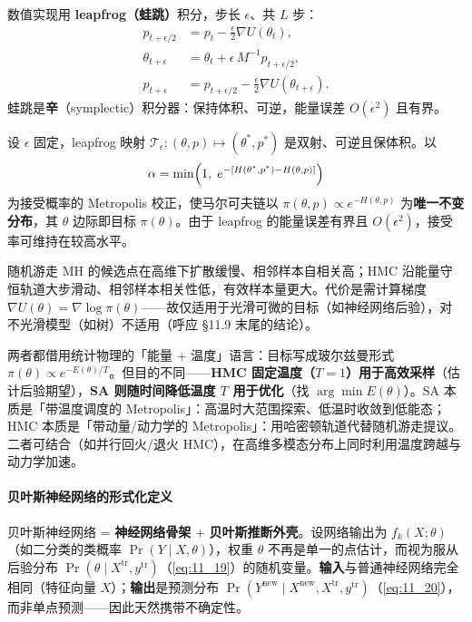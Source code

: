 数值实现用 \textbf{leapfrog（蛙跳）}积分，步长 $\epsilon$、共 $L$ 步：
\begin{align}
p_{t+\epsilon/2} &= p_t - \tfrac{\epsilon}{2}\nabla U(\theta_t), \nonumber \\
\theta_{t+\epsilon} &= \theta_t + \epsilon\, M^{-1} p_{t+\epsilon/2}, \nonumber \\
p_{t+\epsilon} &= p_{t+\epsilon/2} - \tfrac{\epsilon}{2}\nabla U(\theta_{t+\epsilon}). \label{eq:11_20a}
\end{align}
蛙跳是\textbf{辛}（symplectic）积分器：保持体积、可逆，能量误差 $O(\epsilon^2)$ 且有界。

\begin{theorem}
设 $\epsilon$ 固定，leapfrog 映射 $\mathcal{T}_\epsilon:(\theta,p)\mapsto(\theta^*,p^*)$ 是双射、可逆且保体积。以
\[
\alpha = \min\Bigl(1,\; e^{-[H(\theta^*,p^*)-H(\theta,p)]}\Bigr)
\]
为接受概率的 Metropolis 校正，使马尔可夫链以 $\pi(\theta,p)\propto e^{-H(\theta,p)}$ 为\textbf{唯一不变分布}，其 $\theta$ 边际即目标 $\pi(\theta)$。由于 leapfrog 的能量误差有界且 $O(\epsilon^2)$，接受率可维持在较高水平。
\end{theorem}

\begin{remark}
随机游走 MH 的候选点在高维下扩散缓慢、相邻样本自相关高；HMC 沿能量守恒轨道大步滑动、相邻样本相关性低，有效样本量更大。代价是需计算梯度 $\nabla U(\theta)=\nabla\log\pi(\theta)$——故仅适用于光滑可微的目标（如神经网络后验），对不光滑模型（如树）不适用（呼应 §11.9 末尾的结论）。
\end{remark}

\begin{remark}
两者都借用统计物理的「能量 + 温度」语言：目标写成玻尔兹曼形式 $\pi(\theta)\propto e^{-E(\theta)/T}$。但目的不同——\textbf{HMC 固定温度（$T=1$）用于高效采样}（估计后验期望），\textbf{SA 则随时间降低温度 $T$ 用于优化}（找 $\arg\min E(\theta)$）。SA 本质是「带温度调度的 Metropolis」：高温时大范围探索、低温时收敛到低能态；HMC 本质是「带动量/动力学的 Metropolis」：用哈密顿轨道代替随机游走提议。二者可结合（如并行回火/退火 HMC），在高维多模态分布上同时利用温度跨越与动力学加速。
\end{remark}

\paragraph{贝叶斯神经网络的形式化定义}

\begin{definition}
贝叶斯神经网络 = \textbf{神经网络骨架} + \textbf{贝叶斯推断外壳}。设网络输出为 $f_k(X;\theta)$（如二分类的类概率 $\Pr(Y\mid X,\theta)$），权重 $\theta$ 不再是单一的点估计，而视为服从后验分布 $\Pr(\theta\mid X^{\mathrm{tr}},y^{\mathrm{tr}})$（\ref{eq:11_19}）的随机变量。\textbf{输入}与普通神经网络完全相同（特征向量 $X$）；\textbf{输出}是预测分布 $\Pr(Y^{\mathrm{new}}\mid X^{\mathrm{new}},X^{\mathrm{tr}},y^{\mathrm{tr}})$（\ref{eq:11_20}），而非单点预测——因此天然携带不确定性。
\end{definition}

